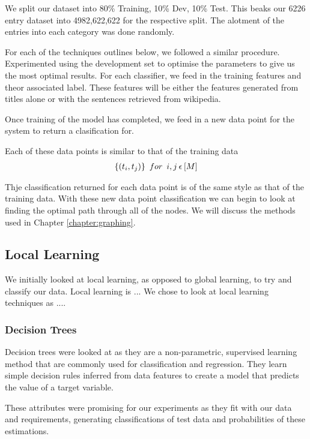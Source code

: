 \documentclass[bsc,frontabs,twoside,singlespacing,parskip,deptreport]{infthesis}     %
\begin{document}
We split our dataset into 80\% Training, 10\% Dev, 10\% Test. This beaks our 6226 entry dataset into 4982,622,622 for the respective split.
The alotment of the entries into each category was done randomly.

For each of the techniques outlines below, we followed a similar procedure.
Experimented using the development set to optimise the parameters to give us the most optimal results.
For each classifier, we feed in the training features and theor associated label. These features will
be either the features generated from titles alone or with the sentences retrieved from wikipedia.

Once training of the model has completed, we feed in a new data point for the system to return a clasification for.

Each of these data points is similar to that of the training data
 \begin{eqnarray}
   \{(t_{i},t_{j})\} \hspace{0.5em} for \hspace{0.5em} i,j \hspace{0.2em}\epsilon \hspace{0.2em}[M]\nonumber
 \end{eqnarray}

 Thje classification returned for each data point is of the same style as that of the training data.
 With these new data point classification we can begin to look at finding the optimal path through all of the nodes.
 We will discuss the methods used in Chapter \ref{chapter:graphing}.
 


\subsection{Local Learning}
We initially looked at local learning, as opposed to global learning, to try and classify our data.
Local learning is ...
We chose to look at local learning techniques as .... 
\subsubsection{Decision Trees}
Decision trees were looked at as they are a non-parametric, supervised learning method
that are commonly used for classification and regression. They learn simple decision rules inferred from
data features to create a model that predicts the value of a target variable.

These attributes were promising for our experiments as they fit with our data and requirements, generating
classifications of test data and probabilities of these estimations.
\end{document}
